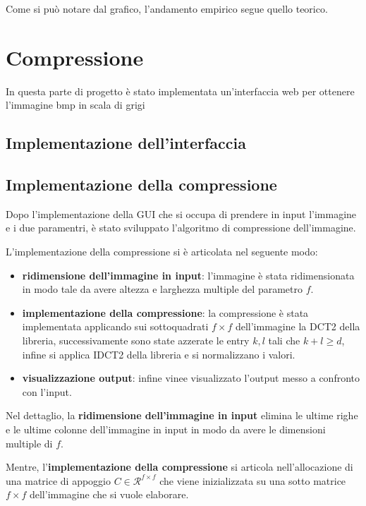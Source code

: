 Come si può notare dal grafico, l'andamento empirico segue quello teorico.

\section{Compressione}
In questa parte di progetto è stato implementata un'interfaccia web per ottenere 
l'immagine bmp in scala di grigi 

\subsection{Implementazione dell'interfaccia}

\subsection{Implementazione della compressione}
Dopo l'implementazione della GUI che si occupa di prendere in input l'immagine e 
i due paramentri, è stato sviluppato l'algoritmo di compressione dell'immagine.

L'implementazione della compressione si è articolata nel seguente modo:
\begin{itemize}
    \item \textbf{ridimensione dell'immagine in input}: l'immagine è stata ridimensionata 
    in modo tale da avere altezza e larghezza multiple del parametro $f$.
    \item \textbf{implementazione della compressione}: la compressione è stata implementata 
    applicando sui sottoquadrati $f\times f$ dell'immagine la DCT2 della libreria, 
    successivamente sono state azzerate le entry $k,l$ tali che $k+l\ge d$, infine 
    si applica IDCT2 della libreria e si normalizzano i valori.
    \item \textbf{visualizzazione output}: infine vinee visualizzato l'output 
    messo a confronto con l'input.
\end{itemize}

Nel dettaglio, la \textbf{ridimensione dell'immagine in input} elimina le ultime 
righe e le ultime colonne dell'immagine in input in modo da avere le dimensioni 
multiple di $f$.

Mentre, l'\textbf{implementazione della compressione} si articola nell'allocazione 
di una matrice di appoggio $C\in \mathcal{R}^{f\times f}$ che viene inizializzata 
su una sotto matrice $f\times f$ dell'immagine che si vuole elaborare. 